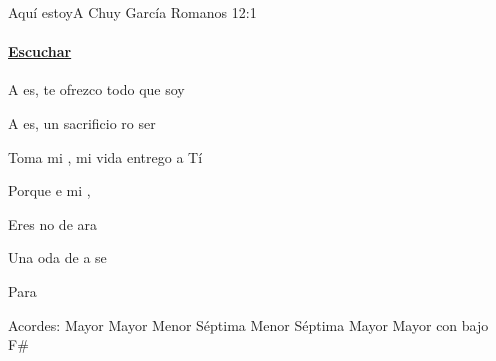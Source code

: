 \documentclass[12pt, spanish]{book}
\newcommand{\NotCCLIed}{\relax}
\begin{document}
    \begin{song}{Aquí estoy}{A}
        {} %
        {Chuy Garc\'ia}
        {Romanos 12:1} %
        {} %
        \ifChordBk
        \paragraph{\mbox{}\hfill\protect\href{https://open.spotify.com/intl-es/track/14YITNb5Ud0zsf3au1s5cR}{Escuchar}\mbox{}\hfill}
        \fi


        \begin{SBOpGroup}
            A es, te ofrezco todo  que soy

            A es, un sacrificio ro ser

            Toma mi , mi vida entrego a Tí
        \end{SBOpGroup}

        \begin{SBOpGroup}
            Porque  e mi ,

            Eres no de ara

            Una oda de a se

            Para 
        \end{SBOpGroup}


        \ifChordBk
        \begin{SBOpGroup}
            Acordes:
             Mayor \hfill
             Mayor \hfill\null\break
             Menor S\'eptima \hfill
             Menor S\'eptima \hfill\null\break
             Mayor \hfill
             Mayor con bajo F\# \hfill\null\break
        \end{SBOpGroup}
        \fi
    \end{song}
\end{document}

